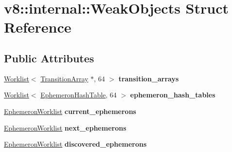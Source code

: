 \hypertarget{structv8_1_1internal_1_1WeakObjects}{}\section{v8\+:\+:internal\+:\+:Weak\+Objects Struct Reference}
\label{structv8_1_1internal_1_1WeakObjects}
\subsection*{Public Attributes}
\begin{DoxyCompactItemize}
\item 
\mbox{\label{structv8_1_1internal_1_1WeakObjects_a3fa2f2bdb35a1ed1f26d4378c2ec4ab7}} 
\mbox{\hyperlink{classv8_1_1internal_1_1Worklist}{Worklist}}$<$ \mbox{\hyperlink{classv8_1_1internal_1_1TransitionArray}{Transition\+Array}} $\ast$, 64 $>$ {\bfseries transition\+\_\+arrays}
\item 
\mbox{\label{structv8_1_1internal_1_1WeakObjects_a0678db4d42e15db6c70d6dc028c4a714}} 
\mbox{\hyperlink{classv8_1_1internal_1_1Worklist}{Worklist}}$<$ \mbox{\hyperlink{classv8_1_1internal_1_1EphemeronHashTable}{Ephemeron\+Hash\+Table}}, 64 $>$ {\bfseries ephemeron\+\_\+hash\+\_\+tables}
\item 
\mbox{\label{structv8_1_1internal_1_1WeakObjects_a9c620583be65b3d4e47b6baef49edaa1}} 
\mbox{\hyperlink{classv8_1_1internal_1_1Worklist}{Ephemeron\+Worklist}} {\bfseries current\+\_\+ephemerons}
\item 
\mbox{\label{structv8_1_1internal_1_1WeakObjects_abf8fb9ba8ed3773236379967e21b0794}} 
\mbox{\hyperlink{classv8_1_1internal_1_1Worklist}{Ephemeron\+Worklist}} {\bfseries next\+\_\+ephemerons}
\item 
\mbox{\label{structv8_1_1internal_1_1WeakObjects_a249331faa5c3d3814f947755b0c3ea32}} 
\mbox{\hyperlink{classv8_1_1internal_1_1Worklist}{Ephemeron\+Worklist}} {\bfseries discovered\+\_\+ephemerons}
\item 
\mbox{\label{structv8_1_1internal_1_1WeakObjects_a4672c6839d97f85db3e99df53a8fe414}} 

\end{DoxyCompactItemize}
